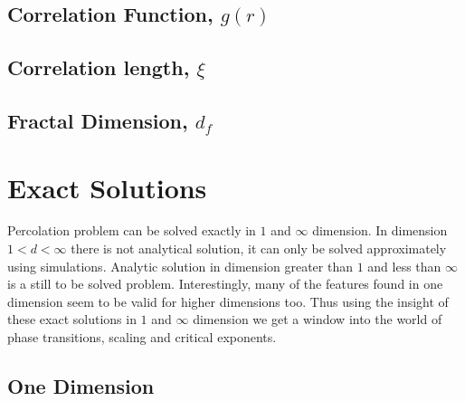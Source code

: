 	\subsection{Correlation Function, $g(r)$}		
	\subsection{Correlation length, $\xi$}
	\subsection{Fractal Dimension, $d_f$} \label{subsect:fractal-dim}

\section{Exact Solutions}
	Percolation problem can be solved exactly in $1$ and $\infty$ dimension. In dimension $1 < d < \infty$ there is not analytical solution, it can only be solved approximately using simulations. Analytic solution in dimension greater than $1$ and less than $\infty$ is a still to be solved problem. Interestingly, many of the features found in one dimension seem to be valid for higher dimensions too. Thus using the insight of these exact solutions in $1$ and $\infty$ dimension we get a window into the world of phase transitions, scaling and critical exponents.
	\subsection{One Dimension}
